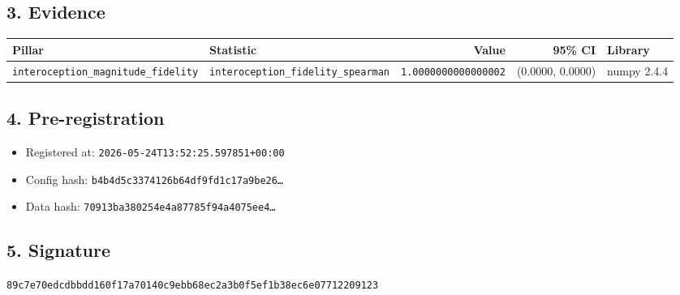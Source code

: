 \documentclass{article}
\begin{document}
\subsection*{3. Evidence}
\begin{tabular}{llrrl}\toprule
\textbf{Pillar} & \textbf{Statistic} & \textbf{Value} & \textbf{95\% CI} & \textbf{Library} \\\midrule
\texttt{interoception\_magnitude\_fidelity} & \texttt{interoception\_fidelity\_spearman} & \texttt{1.0000000000000002} & (0.0000, 0.0000) & numpy 2.4.4 \\
\bottomrule\end{tabular}
\subsection*{4. Pre-registration}
\begin{itemize}
\item Registered at: \texttt{2026-05-24T13:52:25.597851+00:00}
\item Config hash: \texttt{b4b4d5c3374126b64df9fd1c17a9be26\dots}
\item Data hash: \texttt{70913ba380254e4a87785f94a4075ee4\dots}
\end{itemize}
\subsection*{5. Signature}
\texttt{89c7e70edcdbbdd160f17a70140c9ebb68ec2a3b0f5ef1b38ec6e07712209123}\\
\end{document}
